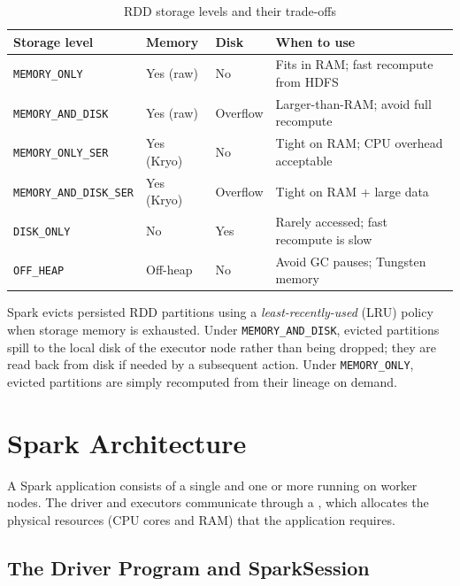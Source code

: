 \begin{table}[h!t]
\centering
\caption{RDD storage levels and their trade-offs}
\label{tab:storage-levels}
\renewcommand{\arraystretch}{1.5}
\begin{tabular}{L{3.2cm} L{1.4cm} L{1.4cm} L{4.5cm}}
\toprule
\textbf{Storage level} & \textbf{Memory} & \textbf{Disk} & \textbf{When to use} \\
\midrule
\texttt{MEMORY\_ONLY}       & Yes (raw) & No  & Fits in RAM; fast recompute from HDFS \\
\texttt{MEMORY\_AND\_DISK}  & Yes (raw) & Overflow & Larger-than-RAM; avoid full recompute \\
\texttt{MEMORY\_ONLY\_SER}  & Yes (Kryo) & No & Tight on RAM; CPU overhead acceptable \\
\texttt{MEMORY\_AND\_DISK\_SER} & Yes (Kryo) & Overflow & Tight on RAM + large data \\
\texttt{DISK\_ONLY}         & No        & Yes & Rarely accessed; fast recompute is slow \\
\texttt{OFF\_HEAP}          & Off-heap  & No  & Avoid GC pauses; Tungsten memory \\
\bottomrule
\end{tabular}
\end{table}

Spark evicts persisted RDD partitions using a \emph{least-recently-used}
(LRU) policy when storage memory is exhausted. Under
\texttt{MEMORY\_AND\_DISK}, evicted partitions spill to the local disk of
the executor node rather than being dropped; they are read back from disk
if needed by a subsequent action. Under \texttt{MEMORY\_ONLY}, evicted
partitions are simply recomputed from their lineage on demand.

\section{Spark Architecture}
\label{sec:spark-arch}

A Spark application consists of a single  and one
or more  running on worker nodes. The driver and
executors communicate through a , which allocates
the physical resources (CPU cores and RAM) that the application requires.

\subsection{The Driver Program and SparkSession}
\label{subsec:driver}

